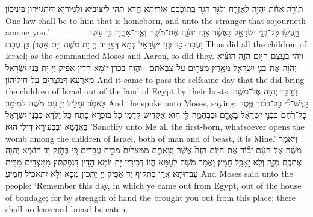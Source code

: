 {תּוֹרָ֣ה אַחַ֔ת יִהְיֶ֖ה לָֽאֶזְרָ֑ח וְלַגֵּ֖ר הַגָּ֥ר בְּתוֹכְכֶֽם׃
}
{אוֹרָיְתָא חֲדָא תְּהֵי לְיַצִּיבַיָּא וּלְגִיּוֹרַיָּא דְּיִתְגַייְּרוּן בֵּינֵיכוֹן׃}
{One law shall be to him that is homeborn, and unto the stranger that sojourneth among you.’}{}
{וַיַּֽעֲשׂ֖וּ כׇּל־בְּנֵ֣י יִשְׂרָאֵ֑ל כַּאֲשֶׁ֨ר צִוָּ֧ה יְהֹוָ֛ה אֶת־מֹשֶׁ֥ה וְאֶֽת־אַהֲרֹ֖ן כֵּ֥ן עָשֽׂוּ׃ \setuma         }
{וַעֲבַדוּ כָל בְּנֵי יִשְׂרָאֵל כְּמָא דְּפַקֵּיד יְיָ יָת מֹשֶׁה וְיָת אַהֲרֹן כֵּן עֲבַדוּ׃}
{Thus did all the children of Israel; as the \lord\space commanded Moses and Aaron, so did they.}{}
{וַיְהִ֕י בְּעֶ֖צֶם הַיּ֣וֹם הַזֶּ֑ה הוֹצִ֨יא יְהֹוָ֜ה אֶת־בְּנֵ֧י יִשְׂרָאֵ֛ל מֵאֶ֥רֶץ מִצְרַ֖יִם עַל־צִבְאֹתָֽם׃ \petucha }
{וַהֲוָה בִּכְרַן יוֹמָא הָדֵין אַפֵּיק יְיָ יָת בְּנֵי יִשְׂרָאֵל מֵאַרְעָא דְּמִצְרַיִם עַל חֵילֵיהוֹן׃}
{And it came to pass the selfsame day that the \lord\space did bring the children of Israel out of the land of Egypt by their hosts.}{}
\newperek
{}%
{וַיְדַבֵּ֥ר יְהֹוָ֖ה אֶל־מֹשֶׁ֥ה לֵּאמֹֽר׃}
{וּמַלֵּיל יְיָ עִם מֹשֶׁה לְמֵימַר׃}
{And the \lord\space spoke unto Moses, saying:}{}
{קַדֶּשׁ־לִ֨י כׇל־בְּכ֜וֹר פֶּ֤טֶר כׇּל־רֶ֙חֶם֙ בִּבְנֵ֣י יִשְׂרָאֵ֔ל בָּאָדָ֖ם וּבַבְּהֵמָ֑ה לִ֖י הֽוּא׃
}
{אַקְדֵּישׁ קֳדָמַי כָּל בּוּכְרָא פָּתַח כָּל וַלְדָּא בִּבְנֵי יִשְׂרָאֵל בַּאֲנָשָׁא וּבִבְעִירָא דִּילִי הוּא׃}
{’Sanctify unto Me all the first-born, whatsoever opens the womb among the children of Israel, both of man and of beast, it is Mine.’}{}
{וַיֹּ֨אמֶר מֹשֶׁ֜ה אֶל־הָעָ֗ם זָכ֞וֹר אֶת־הַיּ֤וֹם הַזֶּה֙ אֲשֶׁ֨ר יְצָאתֶ֤ם מִמִּצְרַ֙יִם֙ מִבֵּ֣ית עֲבָדִ֔ים כִּ֚י בְּחֹ֣זֶק יָ֔ד הוֹצִ֧יא יְהֹוָ֛ה אֶתְכֶ֖ם מִזֶּ֑ה וְלֹ֥א יֵאָכֵ֖ל חָמֵֽץ׃
}
{וַאֲמַר מֹשֶׁה לְעַמָּא הֲווֹ דְּכִירִין יָת יוֹמָא הָדֵין דִּנְפַקְתּוּן מִמִּצְרַיִם מִבֵּית עַבְדּוּתָא אֲרֵי בִּתְקוֹף יַד אַפֵּיק יְיָ יָתְכוֹן מִכָּא וְלָא יִתְאֲכִיל חֲמִיעַ׃}
{And Moses said unto the people: ‘Remember this day, in which ye came out from Egypt, out of the house of bondage; for by strength of hand the \lord\space brought you out from this place; there shall no leavened bread be eaten.}{}

